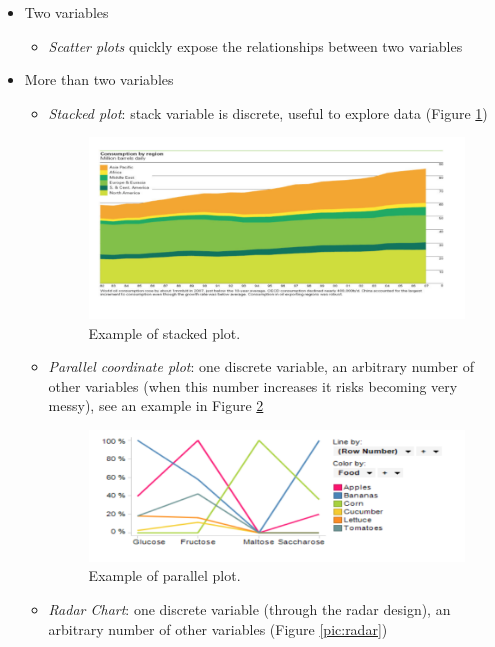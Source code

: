 \begin{itemize}
\item Two variables 
\begin{itemize}
\item \emph{Scatter plots} quickly expose the relationships between two variables
\end{itemize} 
\item  More than two variables
\begin{itemize}
\item \emph{Stacked plot}: stack variable is discrete, useful to explore data (Figure \ref{pic:stacked})
\begin{figure}[h]%
 \centering
 \includegraphics[width=13cm]{./img/06/stacked}
 \caption{\label{pic:stacked} Example of stacked plot.}
\end{figure}
\item \emph{Parallel coordinate plot}: one discrete variable, an arbitrary number of other variables (when this number increases it risks becoming very messy), see an example in Figure \ref{pic:parallel}
\begin{figure}[h]%
 \centering
 \includegraphics[width=13cm]{./img/06/parallel}
 \caption{\label{pic:parallel} Example of parallel plot.}
\end{figure}
\item \emph{Radar Chart}: one discrete variable (through the radar design), an arbitrary number of other variables (Figure \ref{pic:radar})

\end{itemize}
\end{itemize}
